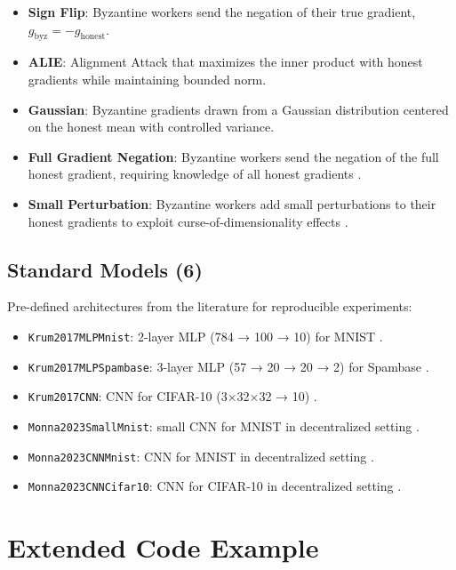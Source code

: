 \documentclass[twoside,11pt]{article}
\begin{document}
\begin{itemize}
    \item \textbf{Sign Flip}: Byzantine workers send the negation of their true gradient, $g_{\text{byz}} = -g_{\text{honest}}$.
    \item \textbf{ALIE}: Alignment Attack that maximizes the inner product with honest gradients while maintaining bounded norm.
    \item \textbf{Gaussian}: Byzantine gradients drawn from a Gaussian distribution centered on the honest mean with controlled variance.
    \item \textbf{Full Gradient Negation}: Byzantine workers send the negation of the full honest gradient, requiring knowledge of all honest gradients \citep{elmhamdi2018hidden}.
    \item \textbf{Small Perturbation}: Byzantine workers add small perturbations to their honest gradients to exploit curse-of-dimensionality effects \citep{elmhamdi2018hidden}.
\end{itemize}

\subsection*{Standard Models (6)}

Pre-defined architectures from the literature for reproducible experiments:

\begin{itemize}
    \item \texttt{Krum2017MLPMnist}: 2-layer MLP (784 → 100 → 10) for MNIST \citep{blanchard2017machine}.
    \item \texttt{Krum2017MLPSpambase}: 3-layer MLP (57 → 20 → 20 → 2) for Spambase \citep{blanchard2017machine}.
    \item \texttt{Krum2017CNN}: CNN for CIFAR-10 (3×32×32 → 10) \citep{blanchard2017machine}.
    \item \texttt{Monna2023SmallMnist}: small CNN for MNIST in decentralized setting \citep{farhadkhani2023monna}.
    \item \texttt{Monna2023CNNMnist}: CNN for MNIST in decentralized setting \citep{farhadkhani2023monna}.
    \item \texttt{Monna2023CNNCifar10}: CNN for CIFAR-10 in decentralized setting \citep{farhadkhani2023monna}.
\end{itemize}

\section{Extended Code Example}
\label{app:example-code}
\end{document}
